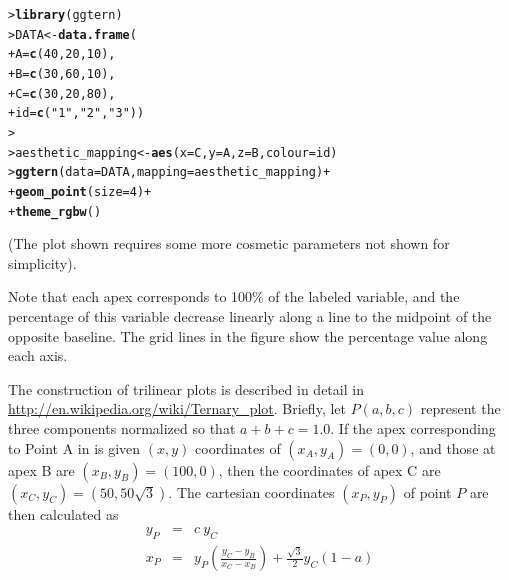 \documentclass[10pt,krantz2]{krantz}\usepackage[]{graphicx}\usepackage[]{color}
\makeatletter
\newcommand{\hlnum}[1]{\textcolor[rgb]{0.686,0.059,0.569}{#1}}%
\newcommand{\hlstr}[1]{\textcolor[rgb]{0.192,0.494,0.8}{#1}}%
\newcommand{\hlopt}[1]{\textcolor[rgb]{0,0,0}{#1}}%
\newcommand{\hlstd}[1]{\textcolor[rgb]{0.345,0.345,0.345}{#1}}%
\newcommand{\hlkwb}[1]{\textcolor[rgb]{0.69,0.353,0.396}{#1}}%
\newcommand{\hlkwc}[1]{\textcolor[rgb]{0.333,0.667,0.333}{#1}}%
\newcommand{\hlkwd}[1]{\textcolor[rgb]{0.737,0.353,0.396}{\textbf{#1}}}%
\newenvironment{kframe}{%
 \def\at@end@of@kframe{}%
 \ifinner\ifhmode%
  \def\at@end@of@kframe{\end{minipage}}%
  \begin{minipage}{\columnwidth}%
 \fi\fi%
 \def\FrameCommand##1{\hskip\@totalleftmargin \hskip-\fboxsep
 \colorbox{shadecolor}{##1}\hskip-\fboxsep
     \hskip-\linewidth \hskip-\@totalleftmargin \hskip\columnwidth}%
 \MakeFramed {\advance\hsize-\width
   \@totalleftmargin\z@ \linewidth\hsize
   \@setminipage}}%
 {\par\unskip\endMakeFramed%
 \at@end@of@kframe}
\newenvironment{knitrout}{}{} %
\renewenvironment{knitrout}{\small\renewcommand{\baselinestretch}{.85}}{} %
\makeatother
\begin{document}
\begin{knitrout}
\color{fgcolor}\begin{kframe}
\begin{alltt}
\hlstd{> }\hlkwd{library}\hlstd{(ggtern)}
\hlstd{> }\hlstd{DATA} \hlkwb{<-} \hlkwd{data.frame}\hlstd{(}
\hlstd{+ }  \hlkwc{A} \hlstd{=} \hlkwd{c}\hlstd{(}\hlnum{40}\hlstd{,} \hlnum{20}\hlstd{,} \hlnum{10}\hlstd{),}
\hlstd{+ }  \hlkwc{B} \hlstd{=} \hlkwd{c}\hlstd{(}\hlnum{30}\hlstd{,} \hlnum{60}\hlstd{,} \hlnum{10}\hlstd{),}
\hlstd{+ }  \hlkwc{C} \hlstd{=} \hlkwd{c}\hlstd{(}\hlnum{30}\hlstd{,} \hlnum{20}\hlstd{,} \hlnum{80}\hlstd{),}
\hlstd{+ }  \hlkwc{id} \hlstd{=} \hlkwd{c}\hlstd{(}\hlstr{"1"}\hlstd{,} \hlstr{"2"}\hlstd{,} \hlstr{"3"}\hlstd{))}
\hlstd{> }
\hlstd{> }\hlstd{aesthetic_mapping} \hlkwb{<-} \hlkwd{aes}\hlstd{(}\hlkwc{x} \hlstd{= C,} \hlkwc{y} \hlstd{= A,} \hlkwc{z} \hlstd{= B,} \hlkwc{colour} \hlstd{= id)}
\hlstd{> }\hlkwd{ggtern}\hlstd{(}\hlkwc{data} \hlstd{= DATA,} \hlkwc{mapping} \hlstd{= aesthetic_mapping)} \hlopt{+}
\hlstd{+ }    \hlkwd{geom_point}\hlstd{(}\hlkwc{size} \hlstd{=} \hlnum{4}\hlstd{)} \hlopt{+}
\hlstd{+ }    \hlkwd{theme_rgbw}\hlstd{()}
\end{alltt}
\end{kframe}
\end{knitrout}
\noindent (The plot shown requires some more cosmetic parameters not
shown for simplicity).

Note that each apex corresponds to 100\% of the labeled
variable, and the percentage of this variable decrease
linearly along a line to the midpoint of the opposite
baseline.
The grid lines in the figure show the percentage value along
each axis.

The construction of trilinear plots is described in detail
in \url{http://en.wikipedia.org/wiki/Ternary_plot}.
Briefly, let $P(a, b, c)$ represent the three components  normalized so
that $a + b + c = 1.0$.
If the apex corresponding to Point A in 
is given $(x, y)$ coordinates of $(x_A, y_A) = (0, 0)$,
and those at apex B are $(x_B, y_B) = (100, 0)$,
then the coordinates of apex C are $(x_C, y_C) = (50, 50\sqrt{3})$.
The cartesian coordinates $(x_P, y_P)$  of point $P$ are then calculated as
\begin{eqnarray*}
y_P & = & c \: y_C \\
x_P & = & y_P \left( \frac{y_C - y_B}{x_C - x_B} \right)
+ \frac{\sqrt{3}}{2} y_C (1 - a) \\
\end{eqnarray*}
\end{document}
